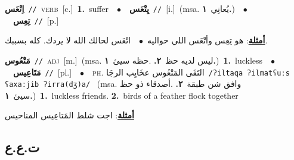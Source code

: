 \documentclass[10pt,a4paper,twoside]{article} %
\begin{document}
\begin{multicols}{2}
{{{{{{{{{{{{\setlength\topsep{0pt}\textbf{\foreignlanguage{arabic}{اِتْعَس}}\ {\color{gray}\texttt{//}\color{black}}\ \textsc{verb}\ [c.]\ \textbf{1.}~suffer\ \ $\bullet$\ \ \setlength\topsep{0pt}\textbf{\foreignlanguage{arabic}{يِتْعَس}}\ {\color{gray}\texttt{//}\color{black}}\ [i.]\ \color{gray}(msa. \foreignlanguage{arabic}{يُعانِي}~\foreignlanguage{arabic}{\textbf{١.}})\color{black}\ \ $\bullet$\ \ \setlength\topsep{0pt}\textbf{\foreignlanguage{arabic}{تِعِس}}\ {\color{gray}\texttt{//}\color{black}}\ [p.]\  \begin{flushright}\color{gray}\foreignlanguage{arabic}{\textbf{\underline{\foreignlanguage{arabic}{أمثلة}}}: هو تِعِس وأتْعَس اللي حواليه\ $\bullet$\ \  اتْعَس لحالك الله لا يردك. كله بسببك.}\end{flushright}\color{black}} \vspace{2mm}

{\setlength\topsep{0pt}\textbf{\foreignlanguage{arabic}{مَتْعُوس}}\ {\color{gray}\texttt{//}\color{black}}\ \textsc{adj}\ [m.]\ \color{gray}(msa. \foreignlanguage{arabic}{ليس لديه حظ}~\foreignlanguage{arabic}{\textbf{٢.}}  .\foreignlanguage{arabic}{حظه سيئ}~\foreignlanguage{arabic}{\textbf{١.}})\color{black}\ \textbf{1.}~luckless\ \ $\bullet$\ \ \setlength\topsep{0pt}\textbf{\foreignlanguage{arabic}{مَتَاعِيس}}\ {\color{gray}\texttt{//}\color{black}}\ [pl.]\ \ $\bullet$\ \ \textsc{ph.} \color{gray} \foreignlanguage{arabic}{التَقَى المَتْعُوس عخَايِب الرجَا}\color{black}\ {\color{gray}\texttt{/{\sffamily ʔiltaqa ʔilmatʕuːs ʕaxaːjib ʔirra(dʒ)a}/}\color{black}}\ \color{gray} (msa. \foreignlanguage{arabic}{وافق شن طبقة}~\foreignlanguage{arabic}{\textbf{٢.}}  .\foreignlanguage{arabic}{أصدقاء ذو حظ سيئ}~\foreignlanguage{arabic}{\textbf{١.}})\color{black}\ \textbf{1.}~luckless friends.  \textbf{2.}~birds of a feather flock together\  \begin{flushright}\color{gray}\foreignlanguage{arabic}{\textbf{\underline{\foreignlanguage{arabic}{أمثلة}}}: اجت شلط المَتاعِيس المناحيس}\end{flushright}\color{black}} \vspace{2mm}

\vspace{-3mm}
\subsection*{\color{blue}\foreignlanguage{arabic}{ت.ع.ع}\color{blue}{}} 

}}}}}}}}}}}
\end{multicols}
\end{document}
